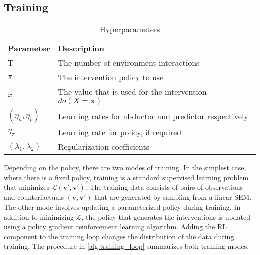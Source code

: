 \documentclass{article}
\begin{document}
\subsection{Training}

\begin{table}[h]
\begin{tabular}{ll}
\textbf{Parameter} & \textbf{Description}                                                                                                     \\
T            & The number of environment interactions                                                                                   \\
$\pi$         & The intervention policy to use \\
$x$ & The value that is used for the intervention $do(X=\mathbf{x})$                                                                  \\
$(\eta_a, \eta_p)$                 & Learning rates for abductor and predictor respectively                                                                                                      \\
$\eta_\pi$ & Learning rate for policy, if required \\
$(\lambda_1, \lambda_2)$         & Regularization coefficients
\end{tabular}
\caption{Hyperparameters}\label{table:hyper_params}
\end{table}

Depending on the policy, there are two modes of training. In the simplest case, where there is a fixed policy, training is a standard supervised learning problem that minimizes $\mathcal{L(\hat{\textbf{v}}', \textbf{v}')}$. The training data consists of pairs of observations and counterfactuals $(\mathbf{v}, \mathbf{v'})$ that are generated by sampling from a linear SEM. The other mode involves updating a parameterized policy during training. In addition to minimizing $\mathcal{L}$, the policy that generates the interventions is updated using a policy gradient reinforcement learning algorithm. Adding the RL component to the training loop changes the distribution of the data during training. The procedure in \autoref{alg:training_loop} summarizes both training modes.

\end{document}
